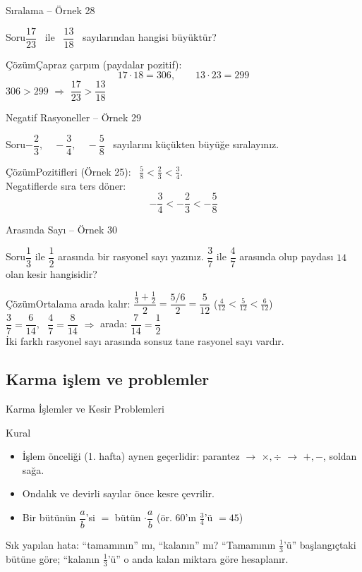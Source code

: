 \documentclass[aspectratio=169,11pt,handout]{beamer}
\newcommand{\soru}[3]{%
\begin{frame}{#1}
  \begin{block}{Soru}\large #2\end{block}
  \pause
  \begin{exampleblock}{Çözüm}\large #3\end{exampleblock}
\end{frame}}
\begin{document}
\soru{Sıralama -- Örnek 28}
{\(\dfrac{17}{23}\) \ ile \ \(\dfrac{13}{18}\) \ sayılarından hangisi büyüktür?}
{Çapraz çarpım (paydalar pozitif):
\[17\cdot 18=306,\qquad 13\cdot 23=299\]
\(306>299\) \(\Rightarrow\) \(\dfrac{17}{23}>\dfrac{13}{18}\)}

\soru{Negatif Rasyoneller -- Örnek 29}
{\(-\dfrac{2}{3},\quad -\dfrac{3}{4},\quad -\dfrac{5}{8}\) \ sayılarını küçükten büyüğe sıralayınız.}
{Pozitifleri (Örnek 25): \ \(\frac{5}{8}<\frac{2}{3}<\frac{3}{4}\).\\[3pt]
Negatiflerde sıra ters döner:
\[-\frac{3}{4}<-\frac{2}{3}<-\frac{5}{8}\]}

\soru{Arasında Sayı -- Örnek 30}
{\(\dfrac{1}{3}\) ile \(\dfrac{1}{2}\) arasında bir rasyonel sayı yazınız. \(\dfrac{3}{7}\) ile \(\dfrac{4}{7}\) arasında olup paydası \(14\) olan kesir hangisidir?}
{Ortalama arada kalır: \(\dfrac{\frac{1}{3}+\frac{1}{2}}{2}=\dfrac{5/6}{2}=\dfrac{5}{12}\) \quad (\(\frac{4}{12}<\frac{5}{12}<\frac{6}{12}\))\\[4pt]
\(\dfrac{3}{7}=\dfrac{6}{14}\), \ \(\dfrac{4}{7}=\dfrac{8}{14}\) \(\Rightarrow\) arada: \(\dfrac{7}{14}=\dfrac{1}{2}\)\\[3pt]
{\normalsize İki farklı rasyonel sayı arasında sonsuz tane rasyonel sayı vardır.}}

\subsection{Karma işlem ve problemler}
\begin{frame}{Karma İşlemler ve Kesir Problemleri}
\begin{block}{Kural}
\begin{itemize}
\item İşlem önceliği (1. hafta) aynen geçerlidir: parantez \(\to\) \(\times,\div\) \(\to\) \(+,-\), soldan sağa.
\item Ondalık ve devirli sayılar önce kesre çevrilir.
\item Bir bütünün \(\dfrac{a}{b}\)'si \(=\) bütün \(\cdot\dfrac{a}{b}\) \quad (ör. \(60\)'ın \(\frac{3}{4}\)'ü \(=45\))
\end{itemize}
\end{block}
\begin{alertblock}{Sık yapılan hata: ``tamamının'' mı, ``kalanın'' mı?}
``Tamamının \(\frac{1}{3}\)'ü'' başlangıçtaki bütüne göre; ``kalanın \(\frac{1}{3}\)'ü'' o anda kalan miktara göre hesaplanır.
\end{alertblock}
\end{frame}
\end{document}
